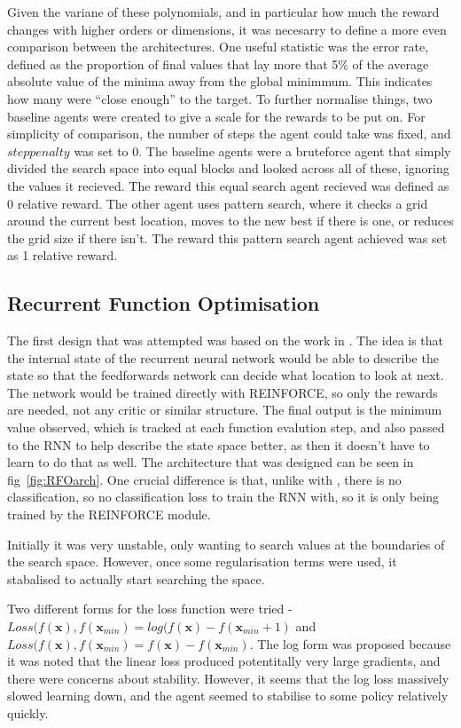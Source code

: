 Given the variane of these polynomials, and in particular how much the reward changes with higher orders or dimensions, it was necesarry to define a more even comparison between the architectures. One useful statistic was the error rate, defined as the proportion of final values that lay more that 5\% of the average absolute value of the minima away from the global minimmum. This indicates how many were ``close enough'' to the target. To further normalise things, two baseline agents were created to give a scale for the rewards to be put on. For simplicity of comparison, the number of steps the agent could take was fixed, and $steppenalty$ was set to 0. The baseline agents were a bruteforce agent that simply divided the search space into equal blocks and looked across all of these, ignoring the values it recieved. The reward this equal search agent recieved was defined as 0 relative reward. The other agent uses pattern search, where it checks a grid around the current best location, moves to the new best if there is one, or reduces the grid size if there isn't. The reward this pattern search agent achieved was set as 1 relative reward.

\subsection{Recurrent Function Optimisation}
The first design that was attempted was based on the work in \cite{RVA}. The idea is that the internal state of the recurrent neural network would be able to describe the state so that the  feedforwards network can decide what location to look at next. The network would be trained directly with REINFORCE, so only the rewards are needed, not any critic or similar structure. The final output is the minimum value observed, which is tracked at each function evalution step, and also passed to the RNN to help describe the state space better, as then it doesn't have to learn to do that as well. The architecture that was designed can be seen in fig~\ref{fig:RFOarch}. One crucial difference is that, unlike with \cite{RVA}, there is no classification, so no classification loss to train the RNN with, so it is only being trained by the REINFORCE module.

Initially it was very unstable, only wanting to search values at the boundaries of the search space. However, once some regularisation terms were used, it stabalised to actually start searching the space.

Two different forms for the loss function were tried - $Loss(f(\boldsymbol{x}), f(\boldsymbol{x}_{min}) = log(f(\boldsymbol{x}) - f(\boldsymbol{x}_{min} +1)$ and $Loss(f(\boldsymbol{x}), f(\boldsymbol{x}_{min}) = f(\boldsymbol{x}) - f(\boldsymbol{x}_{min})$. The log form was proposed because it was noted that the linear loss produced potentitally very large gradients, and there were concerns about stability. However, it seems that the log loss massively slowed learning down, and the agent seemed to stabilise to some policy relatively quickly.

